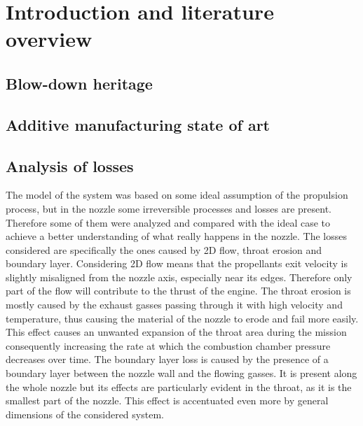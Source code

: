 \section{Introduction and literature overview}
\label{sec:introduction}

\subsection{Blow-down heritage}
\label{subsec:blowdown_intro}

\subsection{Additive manufacturing state of art}
\label{subsec:additive_intro}



\subsection{Analysis of losses}
\label{subsec:losses_intro}
 The model of the system was based on some ideal assumption of the propulsion process, but in the nozzle some irreversible processes and losses are present. Therefore some of them were analyzed and compared with the ideal case to achieve a better understanding of what really happens in the nozzle. The losses considered are specifically the ones caused by 2D flow, throat erosion and boundary layer. Considering 2D flow means that the propellants exit velocity is slightly misaligned from the nozzle axis, especially near its edges. Therefore only part of the flow will contribute to the thrust of the engine. The throat erosion is mostly caused by the exhaust gasses passing through it with high velocity and temperature, thus causing the material of the nozzle to erode and fail more easily. This effect causes an unwanted expansion of the throat area during the mission consequently increasing the rate at which the combustion chamber pressure decreases over time. The boundary layer loss is caused by the presence of a boundary layer between the nozzle wall and the flowing gasses. It is present along the whole nozzle but its effects are particularly evident in the throat, as it is the smallest part of the nozzle. This effect is accentuated even more by general dimensions of the considered system. 

